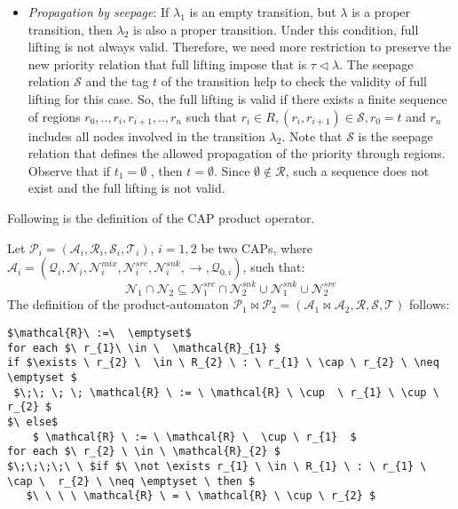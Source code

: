 \begin{itemize} 
 \item \emph{Propagation by seepage}: If $\lambda_{1}$ is an empty transition, but $\lambda$ is a proper transition, then $\lambda_{2}$ is also a proper transition. Under this condition, full lifting is not always valid. Therefore, we need more restriction to preserve the new priority relation that full lifting impose that is $\tau \triangleleft \lambda$. The seepage relation $\mathcal{S}$ and the tag $t$ of the transition help to check the validity of full lifting for this case. So, the full lifting is valid if there exists a finite sequence of regions $r_{0},..,r_{i},r_{i+1},..,r_{n}$ such that $r_{i} \in R, (r_{i}, r_{i+1}) \in \mathcal{S}, r_{0}=t$ and  $r_{n}$ includes all nodes involved in the transition $\lambda_{2}$. Note that $\mathcal{S}$ is the seepage relation that defines the allowed propagation of the priority through regions. Observe that if $t_{1} = \emptyset$ , then $t = \emptyset$. Since $\emptyset \notin \mathcal{R}$, such a sequence does not exist and the full lifting is not valid.
\end{itemize}

Following is the definition of the CAP product operator.
\begin{definition}
Let $\mathcal{P}_{i}=(\mathcal{A}_{i}, \mathcal{R}_{i}, \mathcal{S}_{i}, \mathcal{T}_{i})$, $i=1, 2$ be two %
CAPs, where $\mathcal{A}_{i} = (\mathcal{Q}_{i}, \mathcal{N}_{i}, \mathcal{N}_{i}^{mix}, \mathcal{N}_{i}^{src}, \mathcal{N}_{i}^{snk}, \longrightarrow, \mathcal{Q}_{0,i})$, such that:
\[\mathcal{N}_{1} \cap \mathcal{N}_{2} \subseteq \mathcal{N}_{1}^{src} \cap \mathcal{N}_{2}^{snk} \cup \mathcal{N}_{1}^{snk} \cup \mathcal{N}_{2}^{src}\]
The definition of the product-automaton $\mathcal{P}_{1} \bowtie \mathcal{P}_{2} = (\mathcal{A}_{1} \bowtie \mathcal{A}_{2}, \mathcal{R}, \mathcal{S}, \mathcal{T})$ follows:

  \label{def:productcap}
\end{definition}

\vspace*{-.5cm}

\begin{lstlisting}[frame=single,caption=Calculating $\mathcal{R}$,label=arr:calcR,mathescape]
$\mathcal{R}\ :=\  \emptyset$
for each $\ r_{1}\ \in \  \mathcal{R}_{1} $
if $\exists \ r_{2} \  \in \ R_{2} \ : \ r_{1} \ \cap \ r_{2} \ \neq  \emptyset $
 $\;\; \; \; \mathcal{R} \ := \ \mathcal{R} \ \cup  \ r_{1} \ \cup \ r_{2} $
$\ else$
    $ \mathcal{R} \ := \ \mathcal{R} \  \cup \ r_{1}  $
for each $\ r_{2} \ \in \ \mathcal{R}_{2} $
$\;\;\;\;\ \ $if $\ \not \exists r_{1} \ \in \ R_{1} \ : \ r_{1} \ \cap \  r_{2} \ \neq \emptyset \ then $
   $\ \ \ \ \mathcal{R} \ = \ \mathcal{R} \ \cup \ r_{2} $
\end{lstlisting}

